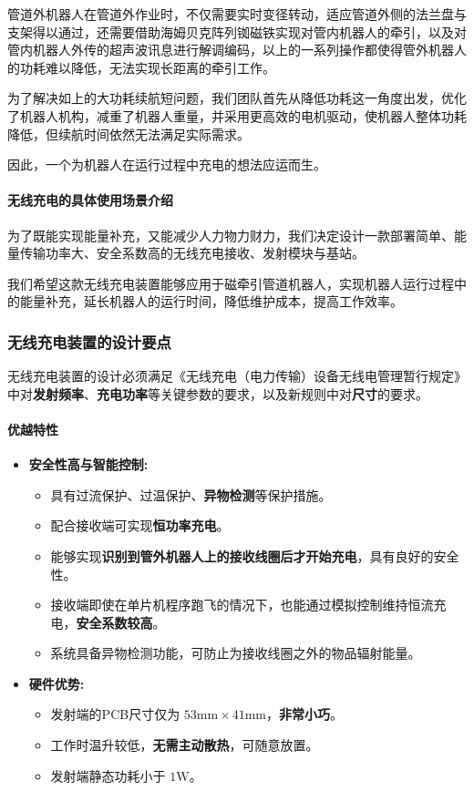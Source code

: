 \documentclass[12pt, a4paper]{article}
\begin{document}
管道外机器人在管道外作业时，不仅需要实时变径转动，适应管道外侧的法兰盘与支架得以通过，还需要借助海姆贝克阵列铷磁铁实现对管内机器人的牵引，以及对管内机器人外传的超声波讯息进行解调编码，以上的一系列操作都使得管外机器人的功耗难以降低，无法实现长距离的牵引工作。

为了解决如上的大功耗续航短问题，我们团队首先从降低功耗这一角度出发，优化了机器人机构，减重了机器人重量，并采用更高效的电机驱动，使机器人整体功耗降低，但续航时间依然无法满足实际需求。

因此，一个为机器人在运行过程中充电的想法应运而生。

\paragraph{无线充电的具体使用场景介绍}

为了既能实现能量补充，又能减少人力物力财力，我们决定设计一款部署简单、能量传输功率大、安全系数高的无线充电接收、发射模块与基站。

我们希望这款无线充电装置能够应用于磁牵引管道机器人，实现机器人运行过程中的能量补充，延长机器人的运行时间，降低维护成本，提高工作效率。

\subsubsection{无线充电装置的设计要点}

无线充电装置的设计必须满足《无线充电（电力传输）设备无线电管理暂行规定》中对\textbf{发射频率}、\textbf{充电功率}等关键参数的要求，以及新规则中对\textbf{尺寸}的要求。

\paragraph{优越特性}

\begin{itemize}
    \item \textbf{安全性高与智能控制:}
    \begin{itemize}
        \item 具有过流保护、过温保护、\textbf{异物检测}等保护措施。
        \item 配合接收端可实现\textbf{恒功率充电}。
        \item 能够实现\textbf{识别到管外机器人上的接收线圈后才开始充电}，具有良好的安全性。
        \item 接收端即使在单片机程序跑飞的情况下，也能通过模拟控制维持恒流充电，\textbf{安全系数较高}。
        \item 系统具备异物检测功能，可防止为接收线圈之外的物品辐射能量。
    \end{itemize}
    \item \textbf{硬件优势:}
    \begin{itemize}
        \item 发射端的PCB尺寸仅为 $53\text{mm} \times 41\text{mm}$，\textbf{非常小巧}。
        \item 工作时温升较低，\textbf{无需主动散热}，可随意放置。
        \item 发射端静态功耗小于 $1\text{W}$。
    \end{itemize}
\end{itemize}
\end{document}
